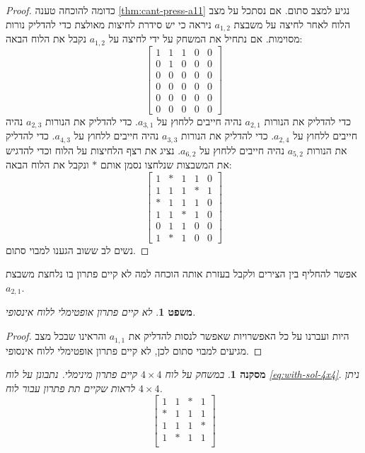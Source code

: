 \documentclass[12pt,leqno]{article}
\theoremstyle{theoremdd}
\newtheorem{theorem}{משפט}[section]
\newtheorem{corollary}{מסקנה}[section]
\begin{document}
\begin{proof}
    כדומה להוכחה 
    טענה 
    \ref{thm:cant-press-a11}
    נגיע למצב סתום.
    אם נסתכל על מצב הלוח לאחר לחיצה על משבצת 
   $a_{1,2}$ 
   ניראה כי יש סידרת לחיצות מאולצת כדי להדליק נורות מסוימות.
   אם נתחיל את המשחק על ידי לחיצה על 
   $a_{1,2}$
   נקבל את הלוח הבאה:
   \[
        \begin{bmatrix}
            1 & 1 & 1 & 0 & 0 \\
            0 & 1 & 0 & 0 & 0 \\
            0 & 0 & 0 & 0 & 0 \\
            0 & 0 & 0 & 0 & 0 \\
            0 & 0 & 0 & 0 & 0 \\
            0 & 0 & 0 & 0 & 0
        \end{bmatrix}
    \]
    כדי להדליק את הנורות 
    $a_{2,1}$
    נהיה חייבים ללחוץ על 
    $a_{3,1}$.
    כדי להדליק את הנורות 
    $a_{2,3}$
    נהיה חייבים ללחוץ על 
    $a_{2,4}$.
    כדי להדליק את הנורות 
    $a_{3,3}$
    נהיה חייבים ללחוץ על 
    $a_{4,3}$.
    כדי להדליק את הנורות 
    $a_{5,2}$
    נהיה חייבים ללחוץ על 
    $a_{6,2}$.
    נציג את רצף הלחיצות על הלוח וכדי
    להדגיש את המשבצות שנלחצו נסמן
    אותם 
    $*$
    ונקבל את הלוח הבאה:
    \begin{equation}
        \label{eq:with-sol-4x4}
        \begin{bmatrix}
            1 & * & 1 & 1 & 0 \\
            1 & 1 & 1 & * & 1 \\
            * & 1 & 1 & 1 & 0 \\
            1 & 1 & * & 1 & 0 \\
            0 & 1 & 1 & 0 & 0 \\
            1 & * & 1 & 0 & 0
        \end{bmatrix}
    \end{equation}
    נשים לב ששוב הגענו למבוי סתום.
\end{proof}
אפשר להחליף בין הצירים ולקבל בעזרת אותה הוכחה 
למה לא קיים פתרון 
בו נלחצת משבצת 
$a_{2,1}$.
\begin{theorem}
    לא קיים פתרון אופטימלי ללוח אינסופי.
\end{theorem}
\begin{proof}
    היות ועברנו על כל האפשרויות שאפשר 
    לנסות להדליק את 
    $a_{1,1}$
    והראינו שבכל מצב מגיעים למבוי סתום
    לכן, לא קיים פתרון אופטימלי ללוח אינסופי.
\end{proof}
\begin{corollary}
    במשחק על לוח 
    $4 \times 4$
    קיים פתרון מינימלי.
    נתבונן על לוח 
    \ref{eq:with-sol-4x4}.
    ניתן לראות שקיים תת פתרון עבור 
    לוח 
    $4 \times 4$.
    \[
    \begin{bmatrix}
        1 & 1 & * & 1\\
        * & 1 & 1 & 1\\
        1 & 1 & 1 & *\\
        1 & * & 1 & 1\\
    \end{bmatrix}
    \]
\end{corollary}
\end{document}
